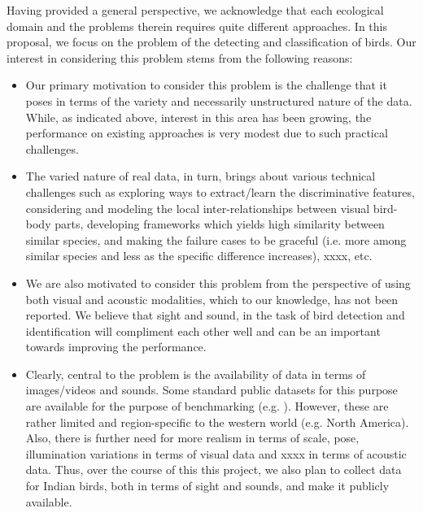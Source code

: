 \documentclass{article}
\begin{document}
Having provided a general perspective, we acknowledge that each ecological domain and the problems therein requires quite different approaches. In this proposal, we focus on the problem of the detecting and classification of birds. Our interest in considering this problem stems from the following reasons: 
\begin{itemize}
\item Our primary motivation to consider this problem is the challenge that it poses in terms of the variety and necessarily unstructured nature of the data. While, as indicated above, interest in this area has been growing, the performance on existing approaches is very modest due to such practical challenges. 
\item The varied nature of real data, in turn, brings about various technical challenges such as exploring ways to extract/learn the discriminative features, considering and modeling the local inter-relationships between visual bird-body parts, developing frameworks which yields high similarity between similar species, and making the failure cases to be graceful (i.e. more among similar species and less as the specific difference increases), xxxx, etc. 
\item We are also motivated to consider this problem from the perspective of using both visual and acoustic modalities, which to our knowledge, has not been reported. We believe that sight and sound, in the task of bird detection and identification will compliment each other well and can be an important towards improving the performance. 
\item Clearly, central to the problem is the availability of data in terms of images/videos and sounds. Some standard public datasets for this purpose are available for the purpose of benchmarking (e.g. \cite{cub}). However, these are rather limited and region-specific to the western world (e.g. North America). Also, there is further need for more realism in terms of scale, pose, illumination variations in terms of visual data and xxxx in terms of acoustic data. Thus, over the course of this this project, we also plan to collect data for Indian birds, both in terms of sight and sounds, and make it publicly available.
\end{itemize}
 
\end{document}
